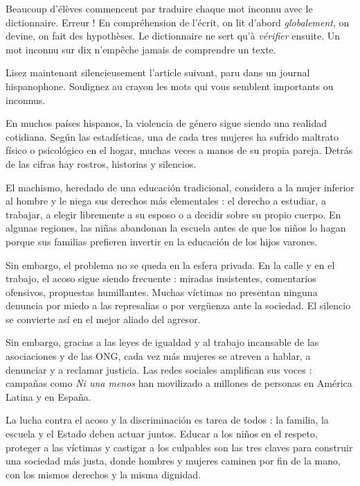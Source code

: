 \documentclass[11pt]{article}
\newcounter{popsec}
\newcounter{popsub}
\newcommand{\courssub}[1]{%
  \stepcounter{popsub}%
  \par\vspace{9pt}\noindent{\popxbold\fontsize{11.5}{13}\selectfont\color{popink}{\color{poporange}\thepopsec.\thepopsub}\hspace{6pt}#1}\par\nopagebreak\vspace{4pt}
}
\begin{document}
\begin{attention}
Beaucoup d'élèves commencent par traduire chaque mot inconnu avec le dictionnaire. Erreur ! En compréhension de l'écrit, on lit d'abord \emph{globalement}, on devine, on fait des hypothèses. Le dictionnaire ne sert qu'à \emph{vérifier} ensuite. Un mot inconnu sur dix n'empêche jamais de comprendre un texte.
\end{attention}

\courssub{Lecture silencieuse du texte}

Lisez maintenant silencieusement l'article suivant, paru dans un journal hispanophone. Soulignez au crayon les mots qui vous semblent importants ou inconnus.

\begin{textebox}
En muchos países hispanos, la violencia de género sigue siendo una realidad cotidiana. Según las estadísticas, una de cada tres mujeres ha sufrido maltrato físico o psicológico en el hogar, muchas veces a manos de su propia pareja. Detrás de las cifras hay rostros, historias y silencios.

El machismo, heredado de una educación tradicional, considera a la mujer inferior al hombre y le niega sus derechos más elementales : el derecho a estudiar, a trabajar, a elegir libremente a su esposo o a decidir sobre su propio cuerpo. En algunas regiones, las niñas abandonan la escuela antes de que los niños lo hagan porque sus familias prefieren invertir en la educación de los hijos varones.

Sin embargo, el problema no se queda en la esfera privada. En la calle y en el trabajo, el acoso sigue siendo frecuente : miradas insistentes, comentarios ofensivos, propuestas humillantes. Muchas víctimas no presentan ninguna denuncia por miedo a las represalias o por vergüenza ante la sociedad. El silencio se convierte así en el mejor aliado del agresor.

Sin embargo, gracias a las leyes de igualdad y al trabajo incansable de las asociaciones y de las ONG, cada vez más mujeres se atreven a hablar, a denunciar y a reclamar justicia. Las redes sociales amplifican sus voces : campañas como \emph{Ni una menos} han movilizado a millones de personas en América Latina y en España.

La lucha contra el acoso y la discriminación es tarea de todos : la familia, la escuela y el Estado deben actuar juntos. Educar a los niños en el respeto, proteger a las víctimas y castigar a los culpables son las tres claves para construir una sociedad más justa, donde hombres y mujeres caminen por fin de la mano, con los mismos derechos y la misma dignidad.
\end{textebox}
\end{document}
